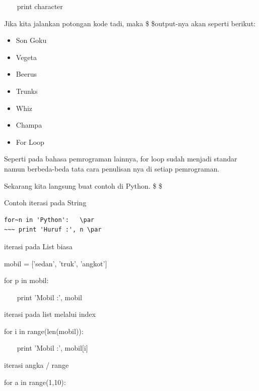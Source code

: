 ~~~ print character \par
\vspace{12pt}
Jika kita jalankan potongan kode tadi, maka \$  \$output-nya akan seperti berikut: \par
\vspace{12pt}
\begin{itemize}
\item
Son Goku
\item
Vegeta
\item
Beerus
\item
Trunks
\item
Whiz
\item
Champa
\item
For Loop
\end{itemize}
Seperti pada bahasa pemrograman lainnya, for loop sudah menjadi standar namun berbeda-beda tata cara penulisan nya di setiap pemrograman. \par
\vspace{12pt}
Sekarang kita langsung buat contoh di Python. \$  \$ \par
\vspace{12pt}
\vspace{12pt}
Contoh iterasi pada String  \par
\vspace{12pt}
\begin{verbatim}
for~n in 'Python':   \par
~~~ print 'Huruf :', n \par
\end{verbatim}
\vspace{12pt}
  \par
iterasi pada List biasa \par
\vspace{12pt}
mobil = ['sedan', 'truk', 'angkot']  \par
for p in mobil: \par
~~~ print 'Mobil :', mobil \par
\vspace{12pt}
\vspace{12pt}
iterasi pada list melalui index \par
for i in range(len(mobil)): \par
~~~ print 'Mobil :', mobil[i] \par
\vspace{12pt}
iterasi angka / range \par
\vspace{12pt}
for a in range(1,10): \par
